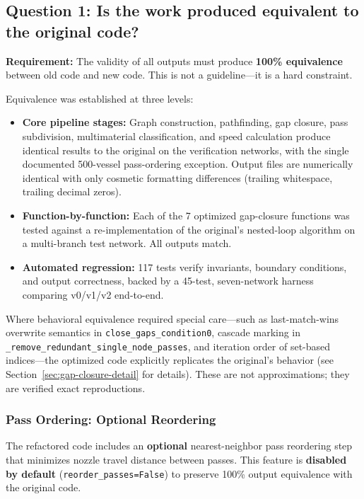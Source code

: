 \documentclass[11pt,a4paper]{article}
\begin{document}
\subsection{Question 1: Is the work produced equivalent to the original code?}

\textbf{Requirement:} The validity of all outputs must produce \textbf{100\% equivalence} between old code and new code. This is not a guideline---it is a hard constraint.

Equivalence was established at three levels:

\begin{itemize}[leftmargin=2em]
    \item \textbf{Core pipeline stages:} Graph construction, pathfinding, gap closure, pass subdivision, multimaterial classification, and speed calculation produce identical results to the original on the verification networks, with the single documented 500-vessel pass-ordering exception. Output files are numerically identical with only cosmetic formatting differences (trailing whitespace, trailing decimal zeros).
    \item \textbf{Function-by-function:} Each of the 7 optimized gap-closure functions was tested against a re-implementation of the original's nested-loop algorithm on a multi-branch test network. All outputs match.
    \item \textbf{Automated regression:} 117 tests verify invariants, boundary conditions, and output correctness, backed by a 45-test, seven-network harness comparing v0/v1/v2 end-to-end.
\end{itemize}

Where behavioral equivalence required special care---such as last-match-wins overwrite semantics in \texttt{close\_gaps\_condition0}, cascade marking in \texttt{\_remove\_redundant\_single\_node\_passes}, and iteration order of set-based indices---the optimized code explicitly replicates the original's behavior (see Section~\ref{sec:gap-closure-detail} for details). These are not approximations; they are verified exact reproductions.

\subsubsection{Pass Ordering: Optional Reordering}
\label{sec:equivalence-note}

The refactored code includes an \textbf{optional} nearest-neighbor pass reordering step that minimizes nozzle travel distance between passes. This feature is \textbf{disabled by default} (\texttt{reorder\_passes=False}) to preserve 100\% output equivalence with the original code.
\end{document}
